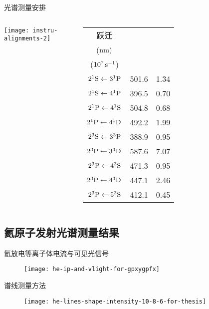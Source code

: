 \begin{frame}{光谱测量安排}
	\begin{columns}
	\begin{center}
		\texttt{[image: instru-alignments-2]}
	\end{center}
\begin{tabular}{ccc}\toprule
跃迁 & \makecell[c]{$\lambda_{q\to p}$\\ (${\rm nm})$} & \makecell[c]{$A_{q\to p}^{\rm eff}$\\ ($10^7\,{\rm s}^{-1}$)}\\
\hline
$2^1{\rm S}\leftarrow3^1{\rm P}$ & 501.6 & 1.34 \\
$2^1{\rm S}\leftarrow4^1{\rm P}$ & 396.5 & 0.70 \\
$2^1{\rm P}\leftarrow4^1{\rm S}$ & 504.8 & 0.68 \\
$2^1{\rm P}\leftarrow4^1{\rm D}$ & 492.2 & 1.99 \\
$2^3{\rm S}\leftarrow3^3{\rm P}$ & 388.9 & 0.95 \\
$2^3{\rm P}\leftarrow3^3{\rm D}$ & 587.6 & 7.07 \\
$2^3{\rm P}\leftarrow4^3{\rm S}$ & 471.3 & 0.95 \\
$2^3{\rm P}\leftarrow4^3{\rm D}$ & 447.1 & 2.46 \\
$2^3{\rm P}\leftarrow5^3{\rm S}$ & 412.1 & 0.45 \\
\bottomrule
\end{tabular}
	\end{columns}
\end{frame}

\subsection{氦原子发射光谱测量结果}

\begin{frame}{氦放电等离子体电流与可见光信号}
	\centering
  \begin{figure}
      \texttt{[image: he-ip-and-vlight-for-gpxygpfx]}
  \end{figure}
\end{frame}

\begin{frame}{谱线测量方法}
	\centering
  \begin{figure}
      \texttt{[image: he-lines-shape-intensity-10-8-6-for-thesis]}
  \end{figure}
\end{frame}

